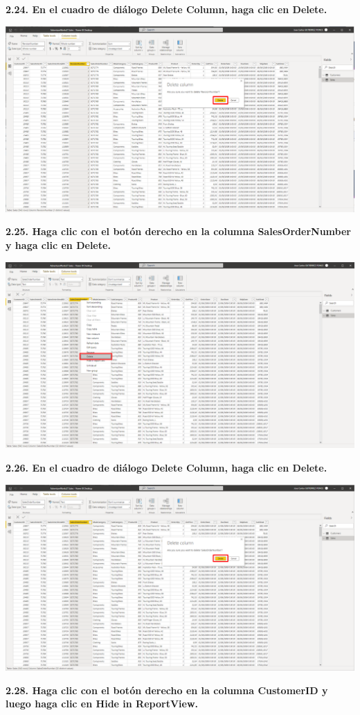 \documentclass{article}
\begin{document}
\textbf{2.24. En el cuadro de diálogo \textbf{Delete Column}, haga clic en \textbf{Delete}.}

    \begin{center}
		\includegraphics[width=14cm]{./images/37} 
	\end{center}
\newpage	
\textbf{2.25. Haga clic con el botón derecho en la columna \textbf{SalesOrderNumber} y haga clic en \textbf{Delete}.}

    \begin{center}
		\includegraphics[width=14cm]{./images/38} 
	\end{center}
	
\textbf{2.26. En el cuadro de diálogo \textbf{Delete Column}, haga clic en \textbf{Delete}.}

    \begin{center}
		\includegraphics[width=14cm]{./images/39} 
	\end{center}
\newpage	
\textbf{2.28. Haga clic con el botón derecho en la columna \textbf{CustomerID} y luego haga clic en \textbf{Hide in ReportView}.}
\end{document}
